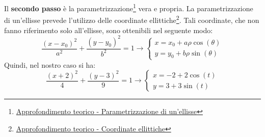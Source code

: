 \documentclass[a4paper]{article}
\begin{document}
	\noindent
	Il \textbf{secondo passo} è la parametrizzazione\footnote{\href{https://www.youmath.it/forum/analisi-2n/70602-parametrizzazione-di-unellisse.html}{Approfondimento teorico - Parametrizzazione di un'ellisse}} vera e propria. La parametrizzazione di un'ellisse prevede l'utilizzo delle coordinate ellittiche\footnote{\href{https://www.youmath.it/forum/analisi-2n/7786-coordinate-ellittiche.html}{Approfondimento teorico - Coordinate ellittiche}}. Tali coordinate, che non fanno riferimento solo all'ellisse, sono ottenibili nel seguente modo:
	\begin{equation*}
		\dfrac{\left(x-x_{0}\right)^{2}}{a^{2}} + \dfrac{\left(y-y_{0}\right)^{2}}{b^{2}} = 1 \longrightarrow
		\begin{cases}
			x = x_{0} + a \rho \cos\left(\theta\right) \\
			y = y_{0} + b \rho \sin\left(\theta\right)
		\end{cases}
	\end{equation*}
	Quindi, nel nostro caso si ha:
	\begin{equation*}
		\dfrac{\left(x+2\right)^{2}}{4} + \dfrac{\left(y-3\right)^{2}}{9} = 1 \longrightarrow
		\begin{cases}
			x = -2 + 2 \cos\left(t\right) \\
			y = 3 + 3 \sin\left(t\right)
		\end{cases}
	\end{equation*}\newpage
\end{document}
